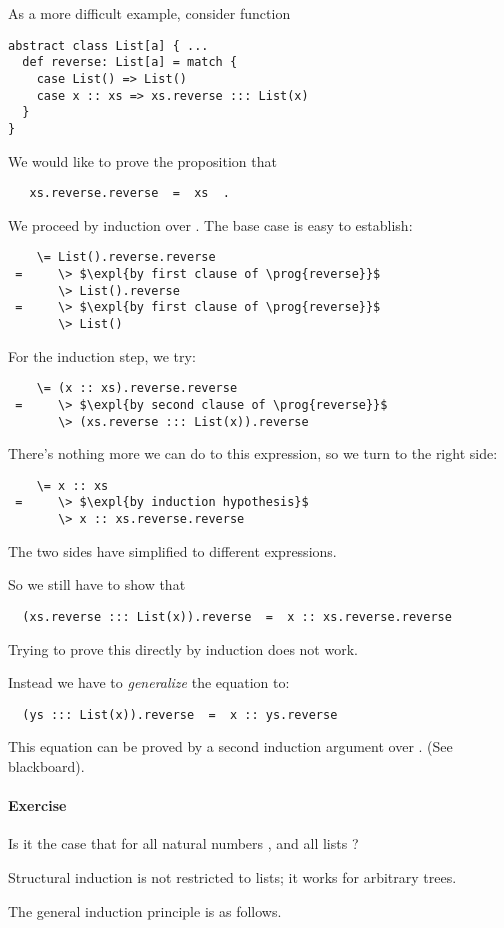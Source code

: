 \documentclass[a4paper,12pt,twoside,titlepage]{book}
\newcommand{\exercise}{\paragraph{Exercise}}
\begin{document}
{As a more difficult example, consider function
\begin{lstlisting}
abstract class List[a] { ...
  def reverse: List[a] = match {
    case List() => List()
    case x :: xs => xs.reverse ::: List(x)
  }
}
\end{lstlisting}
We would like to prove the proposition that
\begin{lstlisting}
   xs.reverse.reverse  =  xs  .
\end{lstlisting}
We proceed by induction over . The base case is easy to establish:
\begin{lstlisting}
    \= List().reverse.reverse
 =     \> $\expl{by first clause of \prog{reverse}}$
       \> List().reverse
 =     \> $\expl{by first clause of \prog{reverse}}$
       \> List()
\end{lstlisting}
\es\bs
For the induction step, we try:
\begin{lstlisting}
    \= (x :: xs).reverse.reverse
 =     \> $\expl{by second clause of \prog{reverse}}$
       \> (xs.reverse ::: List(x)).reverse
\end{lstlisting}
There's nothing more we can do to this expression, so we turn to the right side:
\begin{lstlisting}
    \= x :: xs
 =     \> $\expl{by induction hypothesis}$
       \> x :: xs.reverse.reverse
\end{lstlisting}
The two sides have simplified to different expressions.

So we still have to show that
\begin{lstlisting}
  (xs.reverse ::: List(x)).reverse  =  x :: xs.reverse.reverse
\end{lstlisting}
Trying to prove this directly by induction does not work.

Instead we have to {\em generalize} the equation to:
\begin{lstlisting}
  (ys ::: List(x)).reverse  =  x :: ys.reverse
\end{lstlisting}
\es\bs
This equation can be proved by a second induction argument over .
(See blackboard).

\exercise
Is it the case that  for all 
natural numbers ,  and all lists ?

\es
{}

Structural induction is not restricted to lists; it works for arbitrary
trees.

The general induction principle is as follows.

}
\end{document}
